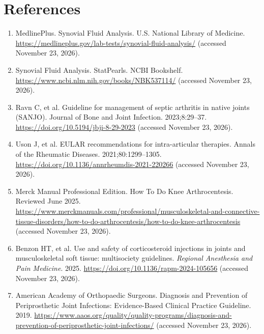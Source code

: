 \section*{References}
\begin{enumerate}
  \item MedlinePlus. Synovial Fluid Analysis. U.S. National Library of Medicine. \url{https://medlineplus.gov/lab-tests/synovial-fluid-analysis/} (accessed November 23, 2026).
  \item Synovial Fluid Analysis. StatPearls. NCBI Bookshelf. \url{https://www.ncbi.nlm.nih.gov/books/NBK537114/} (accessed November 23, 2026).
  \item Ravn C, et al. Guideline for management of septic arthritis in native joints (SANJO). Journal of Bone and Joint Infection. 2023;8:29--37. \url{https://doi.org/10.5194/jbji-8-29-2023} (accessed November 23, 2026).
  \item Uson J, et al. EULAR recommendations for intra-articular therapies. Annals of the Rheumatic Diseases. 2021;80:1299--1305. \url{https://doi.org/10.1136/annrheumdis-2021-220266} (accessed November 23, 2026).
  \item Merck Manual Professional Edition. How To Do Knee Arthrocentesis. Reviewed June 2025. \url{https://www.merckmanuals.com/professional/musculoskeletal-and-connective-tissue-disorders/how-to-do-arthrocentesis/how-to-do-knee-arthrocentesis} (accessed November 23, 2026).
  \item Benzon HT, et al. Use and safety of corticosteroid injections in joints and musculoskeletal soft tissue: multisociety guidelines. \textit{Regional Anesthesia and Pain Medicine}. 2025. \url{https://doi.org/10.1136/rapm-2024-105656} (accessed November 23, 2026).
  \item American Academy of Orthopaedic Surgeons. Diagnosis and Prevention of Periprosthetic Joint Infections: Evidence-Based Clinical Practice Guideline. 2019. \url{https://www.aaos.org/quality/quality-programs/diagnosis-and-prevention-of-periprosthetic-joint-infections/} (accessed November 23, 2026).
\end{enumerate}

\clearpage

